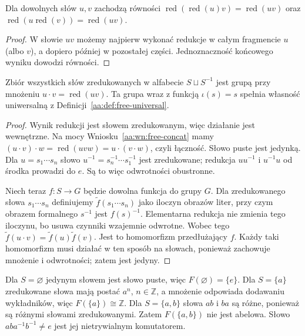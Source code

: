 \begin{wniosek}
\label{aa:wn:free-concat}
\label{wn:redukcja-iloczyn}
Dla dowolnych słów $u,v$ zachodzą równości
$\operatorname{red}(\operatorname{red}(u)v)=\operatorname{red}(uv)$
oraz $\operatorname{red}(u\operatorname{red}(v))=\operatorname{red}(uv)$.
\end{wniosek}
\begin{proof}
W słowie $uv$ możemy najpierw wykonać redukcje
w całym fragmencie $u$ (albo $v$), a dopiero później w pozostałej
części. Jednoznaczność końcowego wyniku dowodzi równości.
\end{proof}

\begin{twierdzenie}
\label{aa:tw:free-exists}
\label{tw:uniwersalnosc}
\label{st:grupa-slow}
Zbiór wszystkich słów zredukowanych w alfabecie
$S\sqcup S^{-1}$ jest grupą przy mnożeniu
$u\cdot v=\operatorname{red}(uv)$.
Ta grupa wraz z funkcją $\iota(s)=s$ spełnia własność
uniwersalną z Definicji~\ref{aa:def:free-universal}.
\end{twierdzenie}
\begin{proof}
Wynik redukcji jest słowem zredukowanym, więc działanie
jest wewnętrzne. Na mocy
Wniosku~\ref{aa:wn:free-concat} mamy
$(u\cdot v)\cdot w=\operatorname{red}(uvw)
=u\cdot(v\cdot w)$, czyli łączność.
Słowo puste jest jedynką. Dla $u=s_1\cdots s_n$ słowo
$u^{-1}=s_n^{-1}\cdots s_1^{-1}$ jest zredukowane;
redukcja $uu^{-1}$ i $u^{-1}u$ od środka prowadzi do $e$.
Są to więc odwrotności obustronne.

Niech teraz $f:S\to G$ będzie dowolna funkcja do grupy $G$.
Dla zredukowanego słowa $s_1\cdots s_n$ definiujemy
$\widetilde f(s_1\cdots s_n)$ jako iloczyn obrazów liter,
przy czym obrazem formalnego $s^{-1}$ jest $f(s)^{-1}$.
Elementarna redukcja nie zmienia tego iloczynu, bo usuwa
czynniki wzajemnie odwrotne. Wobec tego
$\widetilde f(u\cdot v)=\widetilde f(u)\widetilde f(v)$.
Jest to homomorfizm przedłużający $f$.
Każdy taki homomorfizm musi działać w ten sposób na słowach,
ponieważ zachowuje mnożenie i odwrotności; zatem jest jedyny.
\end{proof}

\begin{przyklad}
\label{aa:prz:free-ranks}
Dla $S=\varnothing$ jedynym słowem jest słowo puste, więc
$F(\varnothing)=\{e\}$. Dla $S=\{a\}$ zredukowane słowa mają
postać $a^n$, $n\in\mathbb Z$, a mnożenie odpowiada dodawaniu
wykładników, więc $F(\{a\})\cong\mathbb Z$.
Dla $S=\{a,b\}$ słowa $ab$ i $ba$ są różne, ponieważ są
różnymi słowami zredukowanymi. Zatem $F(\{a,b\})$ nie jest
abelowa. Słowo $aba^{-1}b^{-1}\ne e$ jest jej nietrywialnym
komutatorem.
\end{przyklad}

